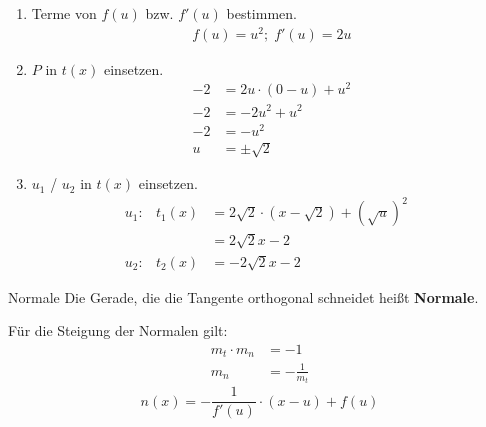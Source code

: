 \documentclass{article}
\begin{document}
\begin{enumerate}
    \item Terme von $f(u)$ bzw. $f'(u)$ bestimmen.
    \begin{align*}
        f(u)=u^2;\;f'(u)=2u
    \end{align*}
    \item $P$ in $t(x)$ einsetzen.
    \begin{align*}
        -2 &= 2u\cdot (0-u)+u^2 \\
        -2 &= -2u^2 +u^2 \\
        -2 &= -u^2 \\
        u &= \pm \sqrt{2}
    \end{align*}
    \item $u_1$ / $u_2$ in $t(x)$ einsetzen.
    \begin{align*}
        &u_1: & t_1(x) &= 2\sqrt{2} \cdot (x-\sqrt{2}) + \left(\sqrt{u}\right)^2  &&\\
        & & &= 2\sqrt{2} x -2 &&\\
        & u_2: & t_2(x) &= -2\sqrt{2} x -2 &&
    \end{align*}
\end{enumerate}
\begin{boxx}[Red]{Normale}
    Die Gerade, die die Tangente orthogonal schneidet heißt \textbf{Normale}.

    Für die Steigung der Normalen gilt:
    \begin{align*}
        m_t \cdot m_n &= -1 \\
        m_n &= -\frac{1}{m_t}
    \end{align*}
    \[n(x) = -\frac{1}{f'(u)}\cdot (x-u)+f(u)\]
\end{boxx}
\end{document}
